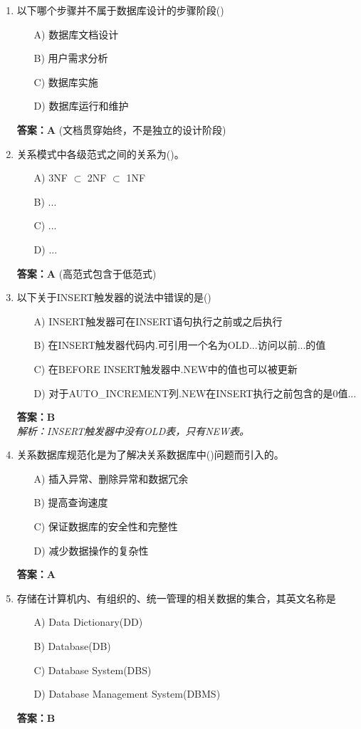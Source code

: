 \documentclass[a4paper,12pt]{article}
\begin{document}
\begin{enumerate}[label=\arabic*.]
\item 以下哪个步骤并不属于数据库设计的步骤阶段()
\begin{itemize}
    \item[A)] 数据库文档设计
    \item[B)] 用户需求分析
    \item[C)] 数据库实施
    \item[D)] 数据库运行和维护
\end{itemize}
\textbf{答案：A} (文档贯穿始终，不是独立的设计阶段)

\item 关系模式中各级范式之间的关系为()。
\begin{itemize}
    \item[A)] 3NF $\subset$ 2NF $\subset$ 1NF
    \item[B)] ...
    \item[C)] ...
    \item[D)] ...
\end{itemize}
\textbf{答案：A} (高范式包含于低范式)

\item 以下关于INSERT触发器的说法中错误的是()
\begin{itemize}
    \item[A)] INSERT触发器可在INSERT语句执行之前或之后执行
    \item[B)] 在INSERT触发器代码内.可引用一个名为OLD...访问以前...的值
    \item[C)] 在BEFORE INSERT触发器中.NEW中的值也可以被更新
    \item[D)] 对于AUTO\_INCREMENT列.NEW在INSERT执行之前包含的是0值...
\end{itemize}
\textbf{答案：B} \\
\textit{解析：INSERT触发器中没有OLD表，只有NEW表。}

\item 关系数据库规范化是为了解决关系数据库中()问题而引入的。
\begin{itemize}
    \item[A)] 插入异常、删除异常和数据冗余
    \item[B)] 提高查询速度
    \item[C)] 保证数据库的安全性和完整性
    \item[D)] 减少数据操作的复杂性
\end{itemize}
\textbf{答案：A}

\item 存储在计算机内、有组织的、统一管理的相关数据的集合，其英文名称是
\begin{itemize}
    \item[A)] Data Dictionary(DD)
    \item[B)] Database(DB)
    \item[C)] Database System(DBS)
    \item[D)] Database Management System(DBMS)
\end{itemize}
\textbf{答案：B}


\end{enumerate}
\end{document}
